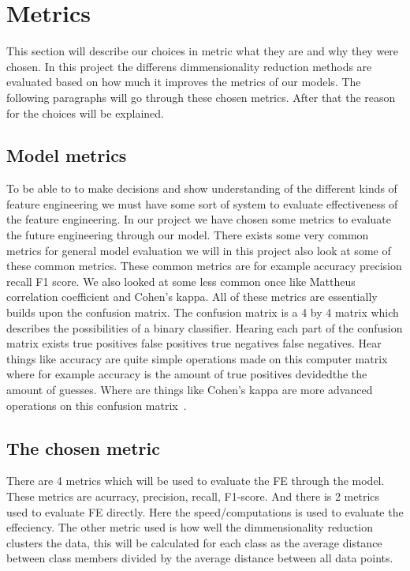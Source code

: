 \section{Metrics}
This section will describe our choices in metric what they are and why they were chosen. In this project the differens dimmensionality reduction methods are evaluated based on how much it improves the metrics of our models.
The following paragraphs will go through these chosen metrics. After that the reason for the choices will be explained.

\subsection{Model metrics}
To be able to to make decisions and show understanding of the different kinds of feature engineering we must have some sort of system to evaluate effectiveness of the  feature engineering. In our project we have chosen some metrics to evaluate the future engineering through our model. There exists some very common metrics for general model evaluation we will in this project also look at some of these common metrics. These common metrics are for example accuracy precision recall F1 score. We also looked at some less common once like Mattheus correlation coefficient and Cohen's kappa. All of these metrics are essentially builds upon the confusion matrix. The confusion matrix is a 4 by 4 matrix which describes the possibilities of a binary classifier. Hearing each part of the confusion matrix exists true positives false positives true negatives false negatives. Hear things like accuracy are quite simple operations made on this computer matrix where for example accuracy is the amount of true positives devidedthe the amount of guesses. Where are things like Cohen's kappa are more advanced operations on this confusion matrix~\cite{metrics-for-multi}.

\subsection{The chosen metric}
There are 4 metrics which will be used to evaluate the FE through the model. These metrics are acurracy, precision, recall, F1-score. And there is 2 metrics used to evaluate FE directly. Here the speed/computations is used to evaluate the effeciency. The other metric used is how well the dimmensionality reduction clusters the data, this will be calculated for each class as the average distance between class members divided by the average distance between all data points.

